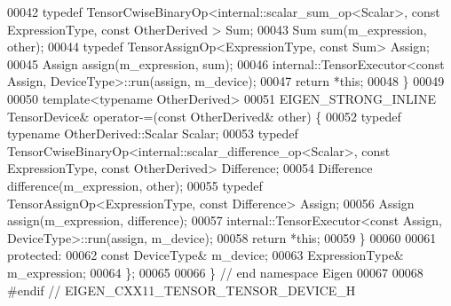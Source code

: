 \begin{DoxyCode}
00042       \textcolor{keyword}{typedef} TensorCwiseBinaryOp<internal::scalar\_sum\_op<Scalar>, \textcolor{keyword}{const} ExpressionType, \textcolor{keyword}{const} OtherDerived
      > Sum;
00043       Sum sum(m\_expression, other);
00044       \textcolor{keyword}{typedef} TensorAssignOp<ExpressionType, const Sum> Assign;
00045       Assign assign(m\_expression, sum);
00046       internal::TensorExecutor<const Assign, DeviceType>::run(assign, m\_device);
00047       \textcolor{keywordflow}{return} *\textcolor{keyword}{this};
00048     \}
00049 
00050     \textcolor{keyword}{template}<\textcolor{keyword}{typename} OtherDerived>
00051     EIGEN\_STRONG\_INLINE TensorDevice& operator-=(\textcolor{keyword}{const} OtherDerived& other) \{
00052       \textcolor{keyword}{typedef} \textcolor{keyword}{typename} OtherDerived::Scalar Scalar;
00053       \textcolor{keyword}{typedef} TensorCwiseBinaryOp<internal::scalar\_difference\_op<Scalar>, \textcolor{keyword}{const} ExpressionType, \textcolor{keyword}{const} 
      OtherDerived> Difference;
00054       Difference difference(m\_expression, other);
00055       \textcolor{keyword}{typedef} TensorAssignOp<ExpressionType, const Difference> Assign;
00056       Assign assign(m\_expression, difference);
00057       internal::TensorExecutor<const Assign, DeviceType>::run(assign, m\_device);
00058       \textcolor{keywordflow}{return} *\textcolor{keyword}{this};
00059     \}
00060 
00061   \textcolor{keyword}{protected}:
00062     \textcolor{keyword}{const} DeviceType& m\_device;
00063     ExpressionType& m\_expression;
00064 \};
00065 
00066 \} \textcolor{comment}{// end namespace Eigen}
00067 
00068 \textcolor{preprocessor}{#endif // EIGEN\_CXX11\_TENSOR\_TENSOR\_DEVICE\_H}
\end{DoxyCode}

